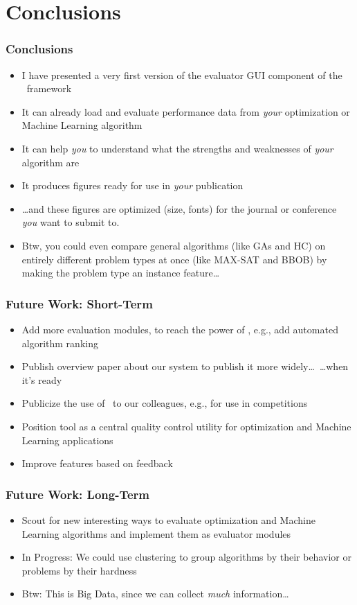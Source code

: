 %
\section{Conclusions}%
%
\begin{frame}%
\frametitle{Conclusions}%
\begin{itemize}%
\item I have presented a very first version of the evaluator GUI component of the \optimizationBenchmarking\ framework%
\item<2-> It can already load and evaluate performance data from \emph{your} optimization or Machine Learning algorithm%
\item<3-> It can help \emph{you} to understand what the strengths and weaknesses of \emph{your} algorithm are%
\item<4-> It produces figures ready for use in \emph{your} publication%
\item<5-> {\dots}and these figures are optimized (size, fonts) for the journal or conference \emph{you} want to submit to.%
\item<6-> Btw, you could even compare general algorithms (like GAs and HC) on entirely different problem types at once (like MAX-SAT and BBOB) by making the problem type an instance feature\dots%
\end{itemize}%
\end{frame}
%
%
\begin{frame}%
\frametitle{Future Work: Short-Term}%
\begin{itemize}%
\item Add more evaluation modules, to reach the power of \tspSuite\expandafter\scitep{\tspSuiteReferences}, e.g., add automated algorithm ranking%
\item<2-> Publish overview paper about our system to publish it more widely\dots\ {\dots}when it's ready%
\item<3-> Publicize the use of \optimizationBenchmarking\ to our colleagues, e.g., for use in competitions%
\item<4-> Position tool as a central quality control utility for optimization and Machine Learning applications%
\item<5-> Improve features based on feedback%
\end{itemize}%
\end{frame}
%
\begin{frame}%
\frametitle{Future Work: Long-Term}%
\begin{itemize}%
\item Scout for new interesting ways to evaluate optimization and Machine Learning algorithms and implement them as evaluator modules%
\item<2-> In Progress: We could use clustering to group algorithms by their behavior or problems by their hardness%
\item<3-> Btw: This is Big Data, since we can collect \emph{much} information\dots%
\end{itemize}%
\end{frame}%
%